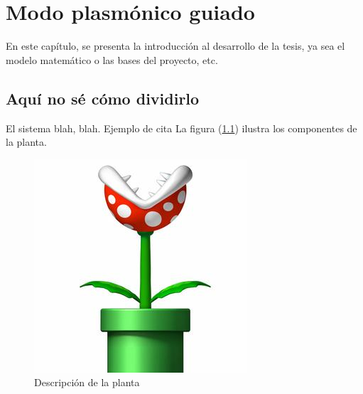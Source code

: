 \chapter{Modo plasmónico guiado}

En este capítulo, se presenta la introducción al desarrollo de la tesis, ya sea el modelo matemático o las bases del proyecto, etc.



\section{Aquí no sé cómo dividirlo}
El sistema blah, blah. Ejemplo de cita \citep{texbook}
La figura (\ref{planta})                     %
 ilustra los componentes de la planta.

\begin{figure}[h]
  
    \includegraphics[scale=0.5]{3-Modo/figs/planta.jpg}     
  \caption{Descripción de la planta}            
  \label{planta}                           
    
\end{figure}





